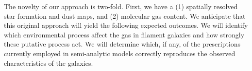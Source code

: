 \documentclass[11pt, preprint]{aastex}
\begin{document}
The novelty of our approach is two-fold.  First, we have a (1)
spatially resolved star formation and dust maps, and (2) molecular
gas content.
We anticipate that this original approach will yield the following
expected outcomes.  We will identify which environmental process
affect the gas in filament galaxies and how strongly these putative process act.  We will determine which, if any, of the prescriptions currently employed in semi-analytic models correctly reproduces the observed characteristics of the galaxies.  %



%
\end{document}
